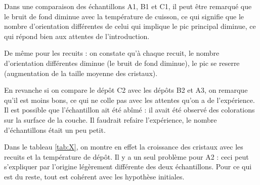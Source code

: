 \documentclass[a4paper,12pt,oneside]{article}
\begin{document}
Dans une comparaison des échantillons A1, B1 et C1, il peut être remarqué que le bruit de fond diminue avec la température de cuisson, ce qui signifie que le nombre d'orientation différentes de celui qui implique le pic principal diminue, ce qui répond bien aux attentes de l'introduction.

De même pour les recuits : on constate qu'à chaque recuit, le nombre d'orientation différentes diminue (le bruit de fond diminue), le pic se reserre (augmentation de la taille moyenne des cristaux).

En revanche si on compare le dépôt C2 avec les dépôts B2 et A3, on remarque qu'il est moins bons, ce qui ne colle pas avec les attentes qu'on a de l'expérience. Il est possible que l'échantillon ait été abîmé : il avait été observé des colorations sur la surface de la couche. Il faudrait refaire l'expérience, le nombre d'échantillons était un peu petit.

Dans le tableau \ref{tab:X}, on montre en effet la croissance des cristaux avec les recuits et la température de dépôt. Il y a un seul problème pour A2 : ceci peut s'expliquer par l'origine légèrement différente des deux échantillons. Pour ce qui est du reste, tout est cohérent avec les hypothèse initiales.
\end{document}

